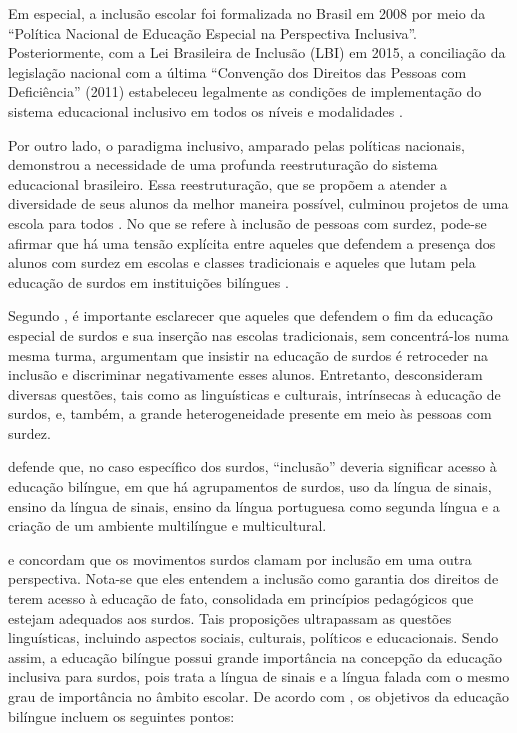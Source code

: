 Em especial, a inclusão escolar foi formalizada no Brasil em 2008 por meio da ``Política Nacional de Educação Especial na Perspectiva Inclusiva''. Posteriormente, com a Lei Brasileira de Inclusão (LBI) em 2015, a conciliação da legislação nacional com a última ``Convenção dos Direitos das Pessoas com Deficiência'' (2011) estabeleceu legalmente as condições de implementação do sistema educacional inclusivo em todos os níveis e modalidades \cite{Alana2019}.

Por outro lado, o paradigma inclusivo, amparado pelas políticas nacionais, demonstrou a necessidade de uma profunda reestruturação do sistema educacional brasileiro. Essa reestruturação, que se propõem a atender a diversidade de seus alunos da melhor maneira possível, culminou projetos de uma escola para todos \cite{Almeida2015}. No que se refere à inclusão de pessoas com surdez, pode-se afirmar que há uma tensão explícita entre aqueles que defendem a presença dos alunos com surdez em escolas e classes tradicionais e aqueles que lutam pela educação de surdos em instituições bilíngues \cite{Almeida2015,Quadros2019}.

Segundo , é importante esclarecer que aqueles que defendem o fim da educação especial de surdos e sua inserção nas escolas tradicionais, sem concentrá-los numa mesma turma, argumentam que insistir na educação de surdos é retroceder na inclusão e discriminar negativamente esses alunos. Entretanto, desconsideram diversas questões, tais como as linguísticas e culturais, intrínsecas à educação de surdos, e, também, a grande heterogeneidade presente em meio às pessoas com surdez.%

 defende que, no caso específico dos surdos, ``inclusão'' deveria significar acesso à educação bilíngue, em que há agrupamentos de surdos, uso da língua de sinais, ensino da língua de sinais, ensino da língua portuguesa como segunda língua e a criação de um ambiente multilíngue e multicultural.

 e  concordam que os movimentos surdos clamam por inclusão em uma outra perspectiva. Nota-se que eles entendem a inclusão como garantia dos direitos de terem acesso à educação de fato, consolidada em princípios pedagógicos que estejam adequados aos surdos. Tais proposições ultrapassam as questões linguísticas, incluindo aspectos sociais, culturais, políticos e educacionais. Sendo assim, a educação bilíngue possui grande importância na concepção da educação inclusiva para surdos, pois trata a língua de sinais e a língua falada com o mesmo grau de importância no âmbito escolar. De acordo com , os objetivos da educação bilíngue incluem os seguintes pontos:

